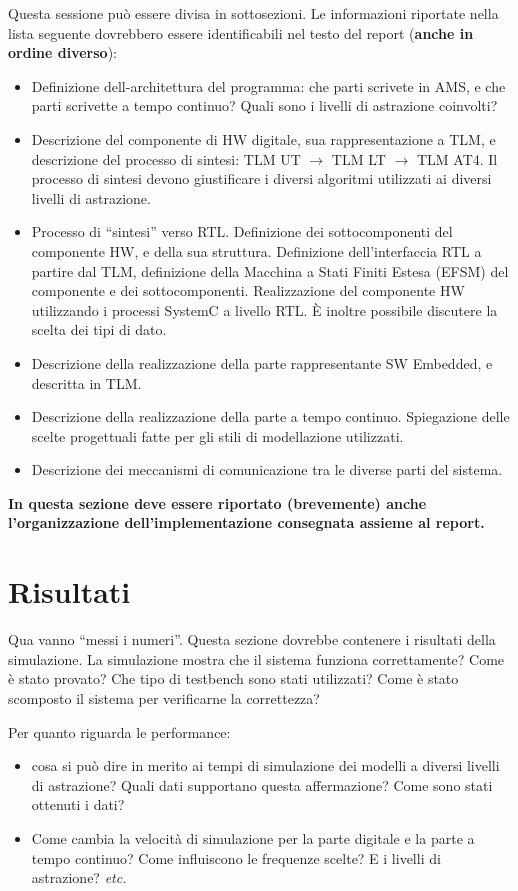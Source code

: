 \documentclass[]{IEEEtran}
\begin{document}
Questa sessione pu\`o essere divisa in sottosezioni. Le informazioni riportate nella lista seguente dovrebbero essere identificabili nel testo del report (\textbf{anche in ordine diverso}):
\begin{itemize}
\item Definizione dell-architettura del programma: che parti scrivete in AMS, e che parti scrivette a tempo continuo? Quali sono i livelli di astrazione coinvolti?
\item Descrizione del componente di HW digitale, sua rappresentazione a TLM, e descrizione del processo di sintesi: TLM UT $\rightarrow$ TLM LT $\rightarrow$ TLM AT4. Il processo di sintesi devono giustificare i diversi algoritmi utilizzati ai diversi livelli di astrazione.
\item Processo di ``sintesi'' verso RTL. Definizione dei sottocomponenti del componente HW, e della sua struttura. Definizione dell'interfaccia RTL a partire dal TLM, definizione della Macchina a Stati Finiti Estesa (EFSM) del componente e dei sottocomponenti. Realizzazione del componente HW utilizzando i processi SystemC a livello RTL. \`E inoltre possibile discutere la scelta dei tipi di dato.
\item Descrizione della realizzazione della parte rappresentante SW Embedded, e descritta in TLM.
\item Descrizione della realizzazione della parte a tempo continuo. Spiegazione delle scelte progettuali fatte per gli stili di modellazione utilizzati.
\item Descrizione dei meccanismi di comunicazione tra le diverse parti del sistema.
\end{itemize}

\textbf{In questa sezione deve essere riportato (brevemente) anche l'organizzazione dell'implementazione consegnata assieme al report.}

\section{Risultati}

Qua vanno ``messi i numeri''. Questa sezione dovrebbe contenere i risultati della simulazione. La simulazione mostra che il sistema funziona correttamente? Come \`e stato provato? Che tipo di testbench sono stati utilizzati? Come \`e stato scomposto il sistema per verificarne la correttezza?

Per quanto riguarda le performance:
\begin{itemize}
\item cosa si pu\`o dire in merito ai tempi di simulazione dei modelli a diversi livelli di astrazione? Quali dati supportano questa affermazione? Come sono stati ottenuti i dati?
\item Come cambia la velocit\`a di simulazione per la parte digitale e la parte a tempo continuo? Come influiscono le frequenze scelte? E i livelli di astrazione? \emph{etc.}
\end{itemize}
\end{document}
